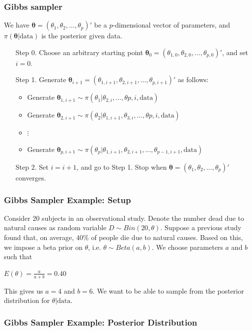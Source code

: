 \documentclass{beamer}
\begin{document}
\begin{frame}
\frametitle{Gibbs sampler}
We have $\pmb{\theta} = (\theta_1, \theta_2, \ldots, \theta_p)'$ be a $p$-dimensional vector of parameters, and $\pi(\pmb{\theta}|\text{data})$ is the posterior given data. 
\begin{enumerate}
\item[Step 0.] Choose an arbitrary starting point $\pmb{\theta}_{0} = (\theta_{1,0}, \theta_{2,0}, \ldots, \theta_{p,0})'$, and set $i = 0$.
\item [Step 1.] Generate $\pmb{\theta}_{i+1} = (\theta_{1,i+1}, \theta_{2,i+1}, \ldots, \theta_{p,i+1})'$ as follows:
	\begin{itemize}
	\item Generate $\pmb{\theta}_{1,i+1} \sim \pi(\theta_1|\theta_{2,i}, \ldots, \theta{p,i},\text{data})$
	\item Generate $\pmb{\theta}_{2,i+1} \sim \pi(\theta_2|\theta_{1,i+1}, \theta_{3,i}, \ldots, \theta{p,i},\text{data})$
	\item $\vdots$
	\item Generate $\pmb{\theta}_{p,i+1} \sim \pi(\theta_p|\theta_{1,i+1}, \theta_{2,i+1}, \ldots, \theta_{p-1,i+1}, \text{data})$
	\end{itemize}
\item [Step 2.] Set $i = i+1$, and go to Step 1.
Stop when $\pmb{\theta} = (\theta_1, \theta_2, \ldots, \theta_p)'$ converges.\footnotemark[1]
\end{enumerate}
\end{frame}

\begin{frame}
\frametitle{Gibbs Sampler Example: Setup}
Consider 20 subjects in an observational study. Denote the number dead due to natural causes as random variable $D \sim Bin(20,\theta)$.  Suppose a previous study found that, on average, $40\%$ of people die due to natural causes. Based on this, we impose a beta prior on $\theta$, i.e. $\theta \sim Beta(a,b)$. We choose parameters $a$ and $b$ such that 
\begin{center}
$E(\theta) = \frac{a}{a+b} = 0.40$
\end{center}
This gives us $a = 4$ and $b = 6$. We want to be able to sample from the posterior distribution for $\theta|\text{data}$. 
\end{frame}

\begin{frame}
\frametitle{Gibbs Sampler Example: Posterior Distribution}

\end{frame}
\end{document}
